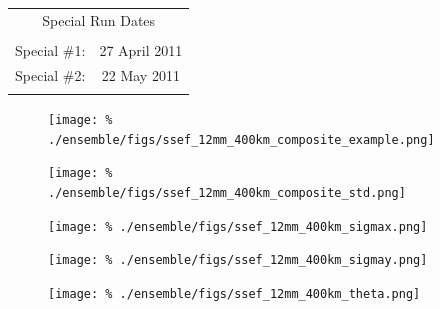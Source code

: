 \begin{table}[cc]
\begin{tabular}{||c c||}
        \multicolumn{2}{||c||}{\Large Special Run Dates} \\
        \vspace{\baselineskip} & \vspace{\baselineskip} \\
        Special \#1: & 27 April 2011 \\
        Special \#2: & 22 May 2011 \\
        \vspace{\baselineskip} & \vspace{\baselineskip} \\
        \hline \hline
    \end{tabular}
\end{table}





\clearpage
\begin{figure}[cc]
    \centering
    \texttt{[image: \%
    ./ensemble/figs/ssef\_12mm\_400km\_composite\_example.png]}\\
    \caption{}
    \label{ssef-12mm-400km-composite}
\end{figure}


\clearpage
\begin{figure}[cc]
    \centering
    \texttt{[image: \%
    ./ensemble/figs/ssef\_12mm\_400km\_composite\_std.png]}\\
    \caption{}
    \label{ssef-12mm-400km-std}
\end{figure}


\clearpage
\begin{figure}[cc]
    \centering
    \texttt{[image: \%
    ./ensemble/figs/ssef\_12mm\_400km\_sigmax.png]}\\
    \caption{}
    \label{sigmax-12mm-400km-dist}
\end{figure}


\clearpage
\begin{figure}[cc]
    \centering
    \texttt{[image: \%
    ./ensemble/figs/ssef\_12mm\_400km\_sigmay.png]}\\
    \caption{}
    \label{sigmay-12mm-400km-dist}
\end{figure}


\clearpage
\begin{figure}[cc]
    \centering
    \texttt{[image: \%
    ./ensemble/figs/ssef\_12mm\_400km\_theta.png]}\\
    \caption{}
    \label{theta-12mm-400km-dist}
\end{figure}


